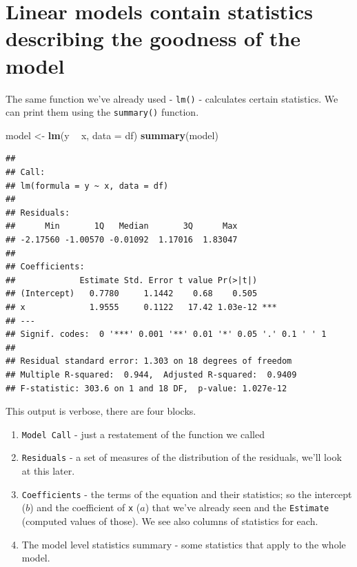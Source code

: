 \documentclass[
]{book}
\newenvironment{Shaded}{\begin{snugshade}}{\end{snugshade}}
\newcommand{\DataTypeTok}[1]{\textcolor[rgb]{0.13,0.29,0.53}{#1}}
\newcommand{\KeywordTok}[1]{\textcolor[rgb]{0.13,0.29,0.53}{\textbf{#1}}}
\newcommand{\NormalTok}[1]{#1}
\newcommand{\OperatorTok}[1]{\textcolor[rgb]{0.81,0.36,0.00}{\textbf{#1}}}
\newcommand{\StringTok}[1]{\textcolor[rgb]{0.31,0.60,0.02}{#1}}
\providecommand{\tightlist}{%
  \setlength{\itemsep}{0pt}\setlength{\parskip}{0pt}}
\begin{document}
\hypertarget{linear-models-contain-statistics-describing-the-goodness-of-the-model}{%
\section{Linear models contain statistics describing the goodness of the model}\label{linear-models-contain-statistics-describing-the-goodness-of-the-model}}

The same function we've already used - \texttt{lm()} - calculates certain statistics. We can print them using the \texttt{summary()} function.

\begin{Shaded}
\begin{Highlighting}[]
\NormalTok{model <-}\StringTok{ }\KeywordTok{lm}\NormalTok{(y }\OperatorTok{~}\StringTok{ }\NormalTok{x, }\DataTypeTok{data =}\NormalTok{ df)}
\KeywordTok{summary}\NormalTok{(model)}
\end{Highlighting}
\end{Shaded}

\begin{verbatim}
## 
## Call:
## lm(formula = y ~ x, data = df)
## 
## Residuals:
##      Min       1Q   Median       3Q      Max 
## -2.17560 -1.00570 -0.01092  1.17016  1.83047 
## 
## Coefficients:
##             Estimate Std. Error t value Pr(>|t|)    
## (Intercept)   0.7780     1.1442    0.68    0.505    
## x             1.9555     0.1122   17.42 1.03e-12 ***
## ---
## Signif. codes:  0 '***' 0.001 '**' 0.01 '*' 0.05 '.' 0.1 ' ' 1
## 
## Residual standard error: 1.303 on 18 degrees of freedom
## Multiple R-squared:  0.944,	Adjusted R-squared:  0.9409 
## F-statistic: 303.6 on 1 and 18 DF,  p-value: 1.027e-12
\end{verbatim}

This output is verbose, there are four blocks.

\begin{enumerate}
\def\labelenumi{\arabic{enumi}.}
\tightlist
\item
  \texttt{Model\ Call} - just a restatement of the function we called
\item
  \texttt{Residuals} - a set of measures of the distribution of the residuals, we'll look at this later.
\item
  \texttt{Coefficients} - the terms of the equation and their statistics; so the intercept (\(b\)) and the coefficient of \texttt{x} (\(a\)) that we've already seen and the \texttt{Estimate} (computed values of those). We see also columns of statistics for each.
\item
  The model level statistics summary - some statistics that apply to the whole model.
\end{enumerate}
\end{document}
